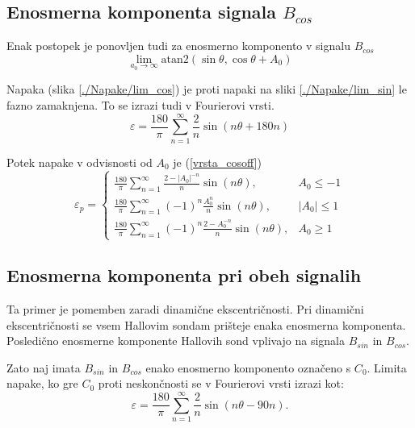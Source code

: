 \subsection{Enosmerna komponenta signala $B_{cos}$}
Enak postopek je ponovljen tudi za enosmerno komponento v signalu $B_{cos}$
\begin{equation}
\lim_{a_0 \rightarrow \infty} \mathrm{atan2}(\sin{\theta},\cos{\theta} + A_0)
\end{equation}

Napaka (slika \ref{./Napake/lim_cos}) je proti napaki na  sliki \ref{./Napake/lim_sin} le fazno zamaknjena.
To se izrazi tudi v Fourierovi vrsti.
\begin{equation}
\varepsilon = \frac{180}{\pi}\sum_{n=1}^{\infty}\frac{2}{n} \sin (n \theta +180 n)
\end{equation}

Potek napake v odvisnosti od $A_0$ je (\ref{vrsta_cosoff})
\begin{equation}
\label{vrsta_cosoff}
\varepsilon_p=
\begin{cases}
\frac{180}{\pi}\sum_{n=1}^{\infty} \frac{2-|A_0|^{-n}}{n} \sin (n \theta ), & A_0\leq -1 \\
\frac{180}{\pi}\sum_{n=1}^{\infty}(-1)^n\frac{A_0^n}{n} \sin (n \theta ), & |A_0|\leq 1 \\
\frac{180}{\pi}\sum_{n=1}^{\infty}(-1)^n\frac{2-A_0^{-n}}{n} \sin (n \theta ), & A_0\geq 1
\end{cases}
\end{equation}
\newpage
\subsection{Enosmerna komponenta pri obeh signalih}
\label{2_offseta}
Ta primer je pomemben zaradi dinamične ekscentričnosti. Pri dinamični ekscentričnosti se vsem Hallovim sondam prišteje enaka enosmerna komponenta. Posledično enosmerne komponente Hallovih sond vplivajo na  signala $B_{sin}$ in $B_{cos}$.

Zato naj imata $B_{sin}$ in $B_{cos}$ enako enosmerno komponento označeno s $C_0$.
Limita napake, ko gre $C_0$ proti neskončnosti se v Fourierovi vrsti izrazi kot:
\begin{equation}
\varepsilon = \frac{180}{\pi}\sum_{n=1}^{\infty}\frac{2}{n} \sin (n \theta- 90 n).
\end{equation}

